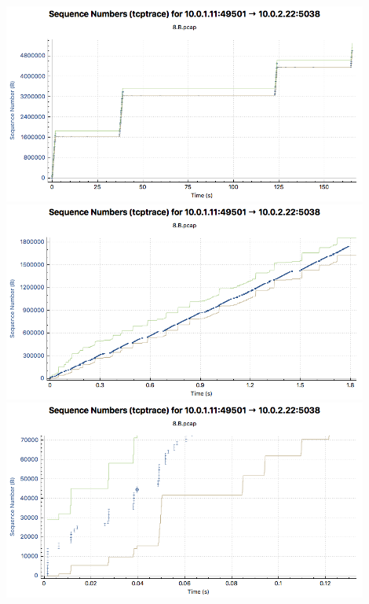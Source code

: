 \begin{center}

\includegraphics[width=0.9\textwidth]{images/8_B_whole.png}
\includegraphics[width=0.9\textwidth]{images/8_B_congestion_avoidance.png}
\includegraphics[width=0.9\textwidth]{images/8_B_slow_start.png}

\end{center}
